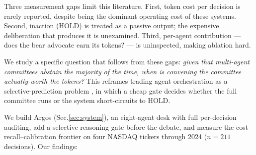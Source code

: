 \documentclass[11pt,a4paper]{article}
\begin{document}
Three measurement gaps limit this literature. First, token cost per decision
is rarely reported, despite being the dominant operating cost of these
systems. Second, inaction (HOLD) is treated as a passive output; the
expensive deliberation that produces it is unexamined. Third, per-agent
contribution --- does the bear advocate earn its tokens? --- is uninspected,
making ablation hard.

We study a specific question that follows from these gaps: \emph{given
that multi-agent committees abstain the majority of the time, when is
convening the committee actually worth the tokens?} This reframes trading
agent orchestration as a selective-prediction problem \citep{chow1970,
geifman2017selective, mozannar2020defer}, in which a cheap gate decides
whether the full committee runs or the system short-circuits to HOLD.

We build Argos (Sec.\ref{sec:system}), an eight-agent desk with full
per-decision auditing, add a selective-reasoning gate before the
debate, and measure the cost--recall--calibration frontier on four
NASDAQ tickers through 2024 ($n{=}211$ decisions). Our findings:
\end{document}
